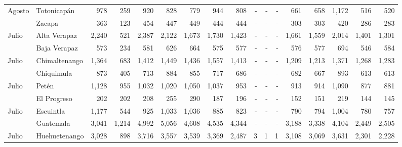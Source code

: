 \begin{landscape}
\begin{center}
\begin{longtable}{llrrrrrrrrrrrrrrr}
\multicolumn{1}{l}{	\footnotesize	 Agosto 	}&	 Totonicapán 	&	 978 	&	 259 	&	 920 	&	 828 	&	 779 	&	 944 	&	 808 	&	 -   	&	 -   	&	 -   	&	 661 	&	 658 	&	 1,172 	&	 516 	&	 520 	\\
\rowcolor{color1!5!white}\multicolumn{1}{l}{	\footnotesize	 Agosto 	}&	 Zacapa 	&	 363 	&	 123 	&	 454 	&	 447 	&	 449 	&	 444 	&	 444 	&	 -   	&	 -   	&	 -   	&	 303 	&	 303 	&	 420 	&	 286 	&	 283 	\\
\multicolumn{1}{l}{	\footnotesize	 Julio 	}&	 Alta Verapaz 	&	 2,240 	&	 521 	&	 2,387 	&	 2,122 	&	 1,673 	&	 1,730 	&	 1,423 	&	 -   	&	 -   	&	 -   	&	 1,661 	&	 1,559 	&	 2,014 	&	 1,401 	&	 1,301 	\\
\rowcolor{color1!5!white}\multicolumn{1}{l}{	\footnotesize	 Julio 	}&	 Baja Verapaz 	&	 573 	&	 234 	&	 581 	&	 626 	&	 664 	&	 575 	&	 577 	&	 -   	&	 -   	&	 -   	&	 576 	&	 577 	&	 694 	&	 546 	&	 584 	\\
\multicolumn{1}{l}{	\footnotesize	 Julio 	}&	 Chimaltenango 	&	 1,364 	&	 683 	&	 1,412 	&	 1,449 	&	 1,436 	&	 1,557 	&	 1,413 	&	 -   	&	 -   	&	 -   	&	 1,209 	&	 1,213 	&	 1,371 	&	 1,268 	&	 1,283 	\\
\rowcolor{color1!5!white}\multicolumn{1}{l}{	\footnotesize	 Julio 	}&	 Chiquimula 	&	 873 	&	 405 	&	 713 	&	 884 	&	 855 	&	 717 	&	 686 	&	 -   	&	 -   	&	 -   	&	 682 	&	 667 	&	 893 	&	 613 	&	 613 	\\
\multicolumn{1}{l}{	\footnotesize	 Julio 	}&	 Petén 	&	 1,128 	&	 955 	&	 1,032 	&	 1,020 	&	 1,050 	&	 1,037 	&	 953 	&	 -   	&	 -   	&	 -   	&	 913 	&	 914 	&	 1,090 	&	 877 	&	 881 	\\
\rowcolor{color1!5!white}\multicolumn{1}{l}{	\footnotesize	 Julio 	}&	 El Progreso 	&	 202 	&	 202 	&	 208 	&	 255 	&	 290 	&	 187 	&	 196 	&	 -   	&	 -   	&	 -   	&	 152 	&	 151 	&	 219 	&	 144 	&	 145 	\\
\multicolumn{1}{l}{	\footnotesize	 Julio 	}&	 Escuintla 	&	 1,177 	&	 544 	&	 925 	&	 1,033 	&	 1,036 	&	 885 	&	 823 	&	 -   	&	 -   	&	 -   	&	 790 	&	 794 	&	 1,004 	&	 780 	&	 757 	\\
\rowcolor{color1!5!white}\multicolumn{1}{l}{	\footnotesize	 Julio 	}&	 Guatemala 	&	 3,041 	&	 1,214 	&	 4,992 	&	 5,056 	&	 4,608 	&	 4,535 	&	 4,344 	&	 -   	&	 -   	&	 -   	&	 3,188 	&	 3,338 	&	 4,104 	&	 2,449 	&	 2,505 	\\
\multicolumn{1}{l}{	\footnotesize	 Julio 	}&	 Huehuetenango 	&	 3,028 	&	 898 	&	 3,716 	&	 3,557 	&	 3,539 	&	 3,369 	&	 2,487 	&	 3 	&	 1 	&	 1 	&	 3,108 	&	 3,069 	&	 3,631 	&	 2,301 	&	 2,228 	\\

\end{longtable}
\end{center}
\end{landscape}
